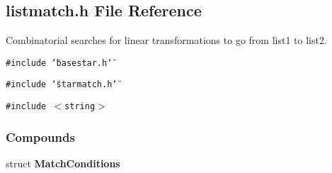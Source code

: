 \subsection{listmatch.h File Reference}
\label{listmatch_h}
Combinatorial searches for linear transformations to go from list1 to list2. 


{\tt \#include \char`\"{}basestar.h\char`\"{}}\par
{\tt \#include \char`\"{}starmatch.h\char`\"{}}\par
{\tt \#include $<$string$>$}\par
\subsubsection*{Compounds}
\begin{CompactItemize}
\item 
struct {\bf Match\-Conditions}
\end{CompactItemize}
